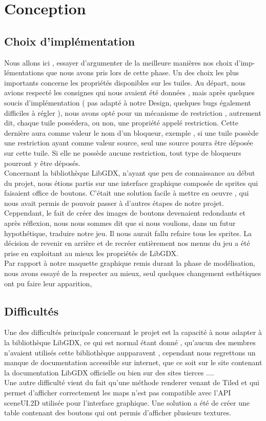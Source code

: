\documentclass[a4paper,10pt]{article}
\begin{document}
\section{Conception}
\subsection{Choix d'implémentation}
Nous allons ici , essayer d'argumenter de la meilleure manières nos choix d'imp-\\lémentations que nous avons pris lors de cette phase.
Un des choix les plus importants concerne les propriétés disponibles sur les tuiles. Au départ, nous avions respecté les consignes qui nous
avaient été données , mais après quelques soucis d'implémentation ( pas adapté à notre Design, quelques bugs également difficiles à régler ), nous
avons opté pour un mécanisme de restriction , autrement dit, chaque tuile possédera, ou non, une propriété appelé restriction. Cette dernière aura
comme valeur le nom d'un bloqueur, exemple , si une tuile possède une restriction ayant comme valeur source, seul une source pourra être déposée sur cette tuile.
Si elle ne possède aucune restriction, tout type de bloqueurs pourront y être déposés. 
\\
Concernant la bibliothèque LibGDX, n'ayant que peu de connaissance au début du projet, nous étions partis sur une interface graphique composée de sprites qui faisaient
office de boutons. C'était une solution facile à mettre en oeuvre , qui nous avait permis de pouvoir passer à d'autres étapes de notre projet.\\
Ceppendant, le fait de créer des images de boutons devenaient redondants et après réflexion, nous nous sommes dit que si nous voulions, dans un futur
hypothétique, traduire notre jeu. Il nous aurait fallu refaire tous les sprites. La décision de revenir en arrière et de recréer entièrement nos menus 
du jeu a été prise en exploitant au mieux les propriétés de LibGDX. 
\\
Par rapport à notre maquette graphique remis durant la phase de modélisation, nous avons essayé de la respecter au mieux, seul quelques changement
esthétiques ont pu faire leur apparition,
\subsection{Difficultés}
Une des difficultés principale concernant le projet est la capacité à nous adapter à la bibliothèque LibGDX, ce qui est normal étant donné , qu'aucun des membres
n'avaient utilisés cette bibliothèque aupparavent , cependant nous regrettons un manque de documentation accessible sur internet, que ce soit sur 
le site contenant la documentation LibGDX officielle ou bien sur des sites tierces ....
\\
Une autre difficulté vient du fait qu'une méthode renderer venant de Tiled et qui permet d'afficher correctement les maps n'est pas compatible avec
l'API sceneUI.2D utilisée pour l'interface graphique. Une solution a été de créer une table contenant des boutons qui ont permis d'afficher plusieurs
textures. 
\end{document}
